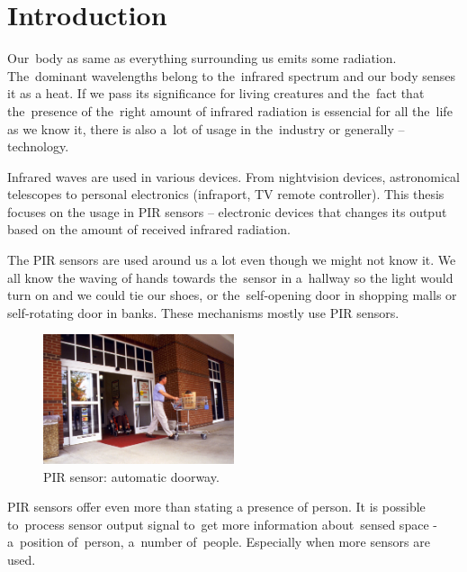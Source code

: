
\chapter{Introduction}
\label{chapter:introduction}


Our~body as same as everything surrounding us emits some radiation. The~dominant wavelengths
belong to the~infrared spectrum and our body senses it as a heat. If we pass its significance
for living creatures and the~fact that the~presence of the~right amount of infrared radiation
is essencial for all the~life as we know it, there is also a~lot of usage in the~industry or
generally -- technology.

Infrared waves are used in various devices. From nightvision devices, astronomical telescopes to personal
electronics (infraport, TV remote controller). This thesis focuses on the usage in PIR
sensors -- electronic devices that changes its output based on the amount of received infrared
radiation.

The PIR sensors are used around us a lot even though we might not know it. We all know the waving
of hands towards the~sensor in a~hallway so the light would turn on and we could tie our shoes,
or the~self-opening door in shopping malls or self-rotating door in banks. These mechanisms mostly
use PIR sensors.

\begin{figure}[h!]
  \begin{center}
    \includegraphics[width=0.5\textwidth]{obrazky-figures/automaticdoorway.jpg}
    \caption{PIR sensor: automatic doorway. \cite{automaticdoorway} \label{fig:automaticdoorway}}
  \end{center}
\end{figure}

PIR sensors offer even more than stating a presence of person. It is possible to~process sensor
output signal to~get more information about~sensed space - a~position of~person, a~number of~people.
Especially when more sensors are used.

